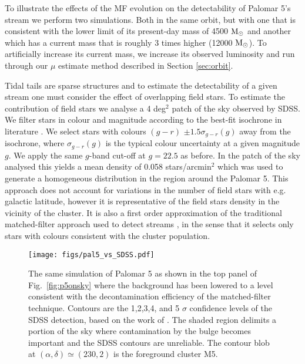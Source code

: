 \documentclass[useAMS,usenatbib,fleqn]{mnras}
\newcommand{\msun}{{\rm M}_\odot}
\begin{document}
To illustrate the effects of the MF evolution on the detectability of Palomar
5's stream we perform two simulations. Both in the same orbit, but with one that
is consistent with the lower limit of its present-day mass of 4500 $\msun$
\citep{Odenkirchen02} and another which has a current mass that is roughly 3
times higher (12000 $\msun$). To artificially increase its current mass, we
increase its observed luminosity and run through our $\mu$ estimate method
described in Section \ref{sec:orbit}.

Tidal tails are sparse structures and to estimate the detectability of a given
stream one must consider the effect of overlapping field stars. To estimate the
contribution of field stars we analyse a 4 deg$^2$ patch of the sky observed by
SDSS. We filter stars in colour and magnitude according  to the best-fit
isochrone in literature \citep{Koch04}. We select stars with colours $(g-r)$
$\pm 1.5 \sigma_{g-r} (g)$ away from the isochrone, where $\sigma_{g-r}(g)$ is the
typical colour uncertainty at a given magnitude $g$. We apply the same $g$-band
cut-off at $g=22.5$ as before. In the patch of the sky analysed this yields a mean
density of 0.058 stars/arcmin$^2$ which was used to generate a homogeneous
distribution in the region around the Palomar 5. This approach does not account
for variations in the number of field stars with e.g. galactic latitude, however
it is representative of the field stars density in the vicinity of the cluster.
It is also a first order approximation of the traditional matched-filter
approach used to detect streams \citep{Odenkirchen01,Balbinot11}, in the sense
that it selects only stars with colours consistent with the cluster population.

\begin{figure*}
\centering
\texttt{[image: figs/pal5\_vs\_SDSS.pdf]}
    \caption{The same simulation of Palomar 5 as shown in the top panel of
    Fig.~\ref{fig:p5onsky} where the background has been lowered to a level
    consistent with the decontamination efficiency of the matched-filter
    technique. Contours are the 1,2,3,4, and 5 $\sigma$ confidence levels of the
    SDSS detection, based on the work of \citet{Balbinot11, Kuepper15}. The
    shaded region delimits a portion of the sky where contamination by the bulge
    becomes important and the SDSS contours are unreliable.  The contour blob at
    $(\alpha, \delta) \simeq (230, 2)$ is the foreground cluster M5.} 
\label{fig:p5SDSS}
\end{figure*}
\end{document}
